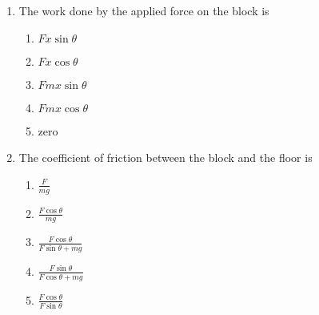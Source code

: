 \documentclass{../../../oss-apphys}
\begin{document}
\begin{multicols}{2}
\begin{center}
  \end{center}
  \begin{enumerate}[resume,leftmargin=18pt]
  \item The work done by the applied force on the block is
    \label{q:down1}
    \begin{enumerate}[nosep,leftmargin=18pt,label=(\Alph*)]
    \item $Fx\sin\theta$
    \item $Fx\cos\theta$
    \item $Fmx\sin\theta$
    \item $Fmx\cos\theta$
    \item zero
    \end{enumerate}
    
  \item The coefficient of friction between the block and the floor is
    \label{q:down2}
    \begin{enumerate}[nosep,leftmargin=18pt,label=(\Alph*)]
    \item $\displaystyle\frac{F}{mg}$
    \item $\displaystyle\frac{F\cos\theta}{mg}$
    \item $\displaystyle\frac{F\cos\theta}{F\sin\theta+mg}$
    \item $\displaystyle\frac{F\sin\theta}{F\cos\theta+mg}$
    \item $\displaystyle\frac{F\cos\theta}{F\sin\theta}$
    \end{enumerate}
  \end{enumerate}
  \columnbreak
  

\end{multicols}
\end{document}
